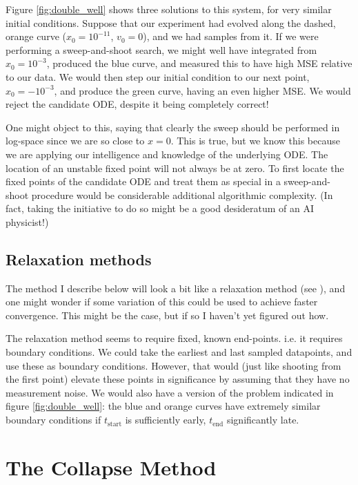 \documentclass{article}
\begin{document}
Figure \ref{fig:double_well} shows three solutions to this system, for very similar initial conditions.
Suppose that our experiment had evolved along the dashed, orange curve ($x_0 = 10^{-11}$, $v_0 = 0$), and we had samples from it.
If we were performing a sweep-and-shoot search, we might well have integrated from $x_0 = 10^{-3}$, produced the blue curve, and measured this to have high MSE relative to our data.
We would then step our initial condition to our next point, $x_0 = -10^{-3}$, and produce the green curve, having an even higher MSE.
We would reject the candidate ODE, despite it being completely correct!

One might object to this, saying that clearly the sweep should be performed in log-space since we are so close to $x=0$.
This is true, but we know this because we are applying our intelligence and knowledge of the underlying ODE.
The location of an unstable fixed point will not always be at zero.
To first locate the fixed points of the candidate ODE and treat them as special in a sweep-and-shoot procedure would be considerable additional algorithmic complexity.
(In fact, taking the initiative to do so might be a good desideratum of an AI physicist!)

\subsection{Relaxation methods}

The method I describe below will look a bit like a relaxation method (see \cite{wikipediaRelaxationMethod}), and one might wonder if some variation of this could be used to achieve faster convergence.
This might be the case, but if so I haven't yet figured out how.

The relaxation method seems to require fixed, known end-points.
i.e. it requires boundary conditions.
We could take the earliest and last sampled datapoints, and use these as boundary conditions.
However, that would (just like shooting from the first point) elevate these points in significance by assuming that they have no measurement noise.
We would also have a version of the problem indicated in figure \ref{fig:double_well}: the blue and orange curves have extremely similar boundary conditions if $t_{\mathrm{start}}$ is sufficiently early, $t_{\mathrm{end}}$ significantly late.

\section{The Collapse Method}
\label{sec:method}




\end{document}
